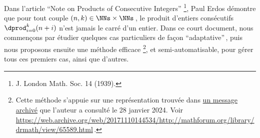 Dans l'article \enquote{Note on Products of Consecutive Integers}
\footnote{
	J. London Math. Soc. 14 (1939).
},
Paul Erdos démontre que pour tout couple $(n, k) \in \NNs \times \NNs$\,, le produit d'entiers consécutifs $\dprod_{i = 0}^{k} (n + i)$ n'est jamais le carré d'un entier. Dans ce court document, nous commençons par étudier quelques cas particuliers de façon \enquote{adaptative}\,, puis nous proposons ensuite une méthode efficace
\footnote{
	Cette méthode s'appuie sur une représentation trouvée dans \href{https://web.archive.org/web/20171110144534/http://mathforum.org/library/drmath/view/65589.html}{un message archivé} que l'auteur a consulté le 28 janvier 2024.
	Voir \url{https://web.archive.org/web/20171110144534/http://mathforum.org/library/drmath/view/65589.html}\,.
},
et semi-automatisable, pour gérer tous ces premiers cas, ainsi que d'autres. 